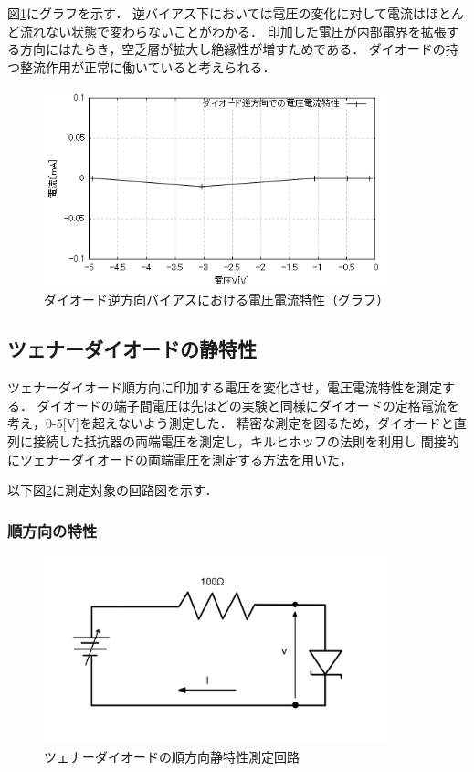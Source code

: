 \documentclass[titlepage]{jarticle}
\begin{document}
図\ref{fig:ダイオード逆方向バイアスにおける電圧電流特性（グラフ）}にグラフを示す．
逆バイアス下においては電圧の変化に対して電流はほとんど流れない状態で変わらないことがわかる．
印加した電圧が内部電界を拡張する方向にはたらき，空乏層が拡大し絶縁性が増すためである．
ダイオードの持つ整流作用が正常に働いていると考えられる．

\begin{figure}[H]
    \begin{center}
        \includegraphics[width=10cm]{graph/2.png}
        \caption{ダイオード逆方向バイアスにおける電圧電流特性（グラフ）}
        \label{fig:ダイオード逆方向バイアスにおける電圧電流特性（グラフ）}
    \end{center}
\end{figure}

\subsection{ツェナーダイオードの静特性}
ツェナーダイオード順方向に印加する電圧を変化させ，電圧電流特性を測定する．
ダイオードの端子間電圧は先ほどの実験と同様にダイオードの定格電流を考え，0-5[V]を超えないよう測定した．
精密な測定を図るため，ダイオードと直列に接続した抵抗器の両端電圧を測定し，キルヒホッフの法則を利用し
間接的にツェナーダイオードの両端電圧を測定する方法を用いた，

以下図\ref{fig:ツェナーダイオードの順方向静特性測定回路}に測定対象の回路図を示す．
\subsubsection{順方向の特性}
\begin{figure}[H]
    \begin{center}
        \includegraphics[width=10cm]{image/tt.jpg}
        \caption{ツェナーダイオードの順方向静特性測定回路}
        \label{fig:ツェナーダイオードの順方向静特性測定回路}
    \end{center}
\end{figure}
\end{document}
